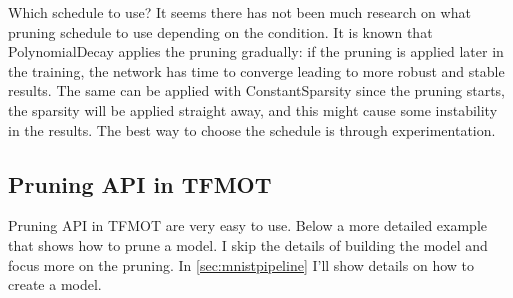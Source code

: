 Which schedule to use? It seems there has not been much research on what
pruning schedule to use depending on the condition.
It is known that PolynomialDecay applies the pruning gradually: if the pruning
is applied later in the training, the network has time to converge leading to
more robust and stable results.
The same can be applied with ConstantSparsity since the pruning starts, the
sparsity will be applied straight away, and this might cause some instability
in the results.
The best way to choose the schedule is through experimentation.

\subsection{Pruning API in TFMOT}
Pruning API in TFMOT are very easy to use. Below a more detailed example that
shows how to prune a model. I skip the details of building the model and focus
more on the pruning. In \autoref{sec:mnistpipeline} I'll show details on how to
create a model.

